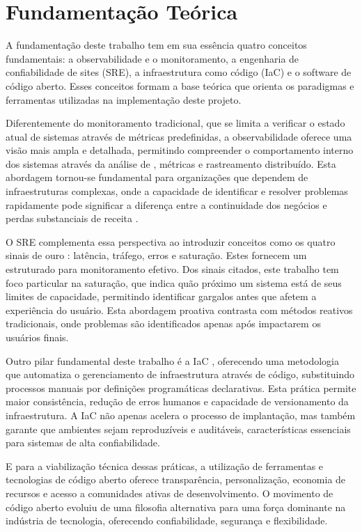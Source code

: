 \chapter{Fundamentação Teórica}
\label{chap2}

A fundamentação deste trabalho tem em sua essência quatro conceitos fundamentais: a observabilidade e o monitoramento, a engenharia de confiabilidade de sites (SRE), a infraestrutura como código (IaC) e o software de código aberto. Esses conceitos formam a base teórica que orienta os paradigmas e ferramentas utilizadas na implementação deste projeto.

Diferentemente do monitoramento tradicional, que se limita a verificar o estado atual de sistemas através de métricas predefinidas, a observabilidade \citep{rhobservability2025} oferece uma visão mais ampla e detalhada, permitindo compreender o comportamento interno dos sistemas através da análise de , métricas e rastreamento distribuído. Esta abordagem tornou-se fundamental para organizações que dependem de infraestruturas complexas, onde a capacidade de identificar e resolver problemas rapidamente pode significar a diferença entre a continuidade dos negócios e perdas substanciais de receita \citep{costofdowntime2024}.

O SRE complementa essa perspectiva ao introduzir conceitos como os quatro sinais de ouro \citep{sre2016}: latência, tráfego, erros e saturação. Estes  fornecem um  estruturado para monitoramento efetivo. Dos sinais citados, este trabalho tem foco particular na saturação, que indica quão próximo um sistema está de seus limites de capacidade, permitindo identificar gargalos antes que afetem a experiência do usuário. Esta abordagem proativa contrasta com métodos reativos tradicionais, onde problemas são identificados apenas após impactarem os usuários finais.

Outro pilar fundamental deste trabalho é a IaC \citep{iac2020}, oferecendo uma metodologia que automatiza o gerenciamento de infraestrutura através de código, substituindo processos manuais por definições programáticas declarativas. Esta prática permite maior consistência, redução de erros humanos e capacidade de versionamento da infraestrutura. A IaC não apenas acelera o processo de implantação, mas também garante que ambientes sejam reproduzíveis e auditáveis, características essenciais para sistemas de alta confiabilidade.

E para a viabilização técnica dessas práticas, a utilização de ferramentas e tecnologias de código aberto oferece transparência, personalização, economia de recursos \citep{hoffmann2024valueoss} e acesso a comunidades ativas de desenvolvimento. O movimento de código aberto evoluiu de uma filosofia alternativa para uma força dominante na indústria de tecnologia, oferecendo confiabilidade, segurança e flexibilidade.

